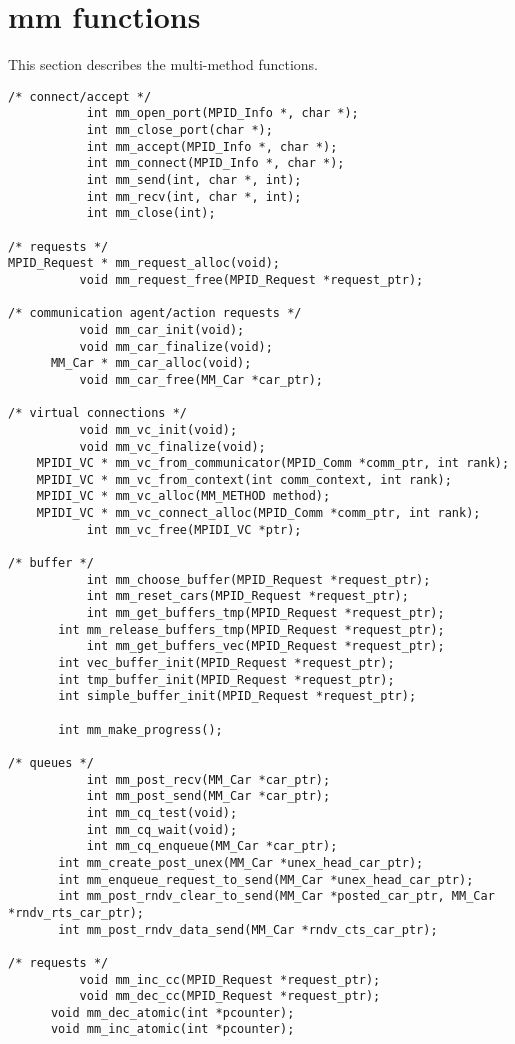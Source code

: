 \documentclass[dvipdfm,twoside,11pt]{article}
\begin{document}
\section{mm functions}
This section describes the multi-method functions.
\begin{verbatim}
/* connect/accept */
           int mm_open_port(MPID_Info *, char *);
           int mm_close_port(char *);
           int mm_accept(MPID_Info *, char *);
           int mm_connect(MPID_Info *, char *);
           int mm_send(int, char *, int);
           int mm_recv(int, char *, int);
           int mm_close(int);

/* requests */
MPID_Request * mm_request_alloc(void);
          void mm_request_free(MPID_Request *request_ptr);

/* communication agent/action requests */
          void mm_car_init(void);
          void mm_car_finalize(void);
      MM_Car * mm_car_alloc(void);
          void mm_car_free(MM_Car *car_ptr);

/* virtual connections */
          void mm_vc_init(void);
          void mm_vc_finalize(void);
    MPIDI_VC * mm_vc_from_communicator(MPID_Comm *comm_ptr, int rank);
    MPIDI_VC * mm_vc_from_context(int comm_context, int rank);
    MPIDI_VC * mm_vc_alloc(MM_METHOD method);
    MPIDI_VC * mm_vc_connect_alloc(MPID_Comm *comm_ptr, int rank);
           int mm_vc_free(MPIDI_VC *ptr);

/* buffer */
           int mm_choose_buffer(MPID_Request *request_ptr);
           int mm_reset_cars(MPID_Request *request_ptr);
           int mm_get_buffers_tmp(MPID_Request *request_ptr);
	   int mm_release_buffers_tmp(MPID_Request *request_ptr);
           int mm_get_buffers_vec(MPID_Request *request_ptr);
	   int vec_buffer_init(MPID_Request *request_ptr);
	   int tmp_buffer_init(MPID_Request *request_ptr);
	   int simple_buffer_init(MPID_Request *request_ptr);

	   int mm_make_progress();

/* queues */
           int mm_post_recv(MM_Car *car_ptr);
           int mm_post_send(MM_Car *car_ptr);
           int mm_cq_test(void);
           int mm_cq_wait(void);
           int mm_cq_enqueue(MM_Car *car_ptr);
	   int mm_create_post_unex(MM_Car *unex_head_car_ptr);
	   int mm_enqueue_request_to_send(MM_Car *unex_head_car_ptr);
	   int mm_post_rndv_clear_to_send(MM_Car *posted_car_ptr, MM_Car *rndv_rts_car_ptr);
	   int mm_post_rndv_data_send(MM_Car *rndv_cts_car_ptr);

/* requests */
          void mm_inc_cc(MPID_Request *request_ptr);
          void mm_dec_cc(MPID_Request *request_ptr);
	  void mm_dec_atomic(int *pcounter);
	  void mm_inc_atomic(int *pcounter);
\end{verbatim}
\end{document}
